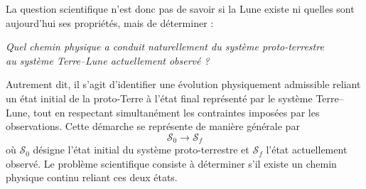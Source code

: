\documentclass[11pt,a4paper,openany]{report}
\begin{document}
La question scientifique n'est donc pas de savoir si la Lune existe ni quelles sont aujourd'hui
ses propriétés, mais de déterminer :

\begin{center}
\emph{Quel chemin physique a conduit naturellement du système proto-terrestre\\ au système
Terre--Lune actuellement observé ?}
\end{center}

Autrement dit, il s'agit d'identifier une évolution physiquement admissible reliant un état
initial de la proto-Terre à l'état final représenté par le système Terre--Lune, tout en respectant
simultanément les contraintes imposées par les observations. Cette démarche se représente de
manière générale par
\begin{equation}
\boxed{\;\mathcal{S}_0\longrightarrow\mathcal{S}_f\;}
\label{eq:S0Sf}
\end{equation}
où $\mathcal{S}_0$ désigne l'état initial du système proto-terrestre et $\mathcal{S}_f$ l'état
actuellement observé. Le problème scientifique consiste à déterminer s'il existe un chemin
physique continu reliant ces deux états.
\end{document}
